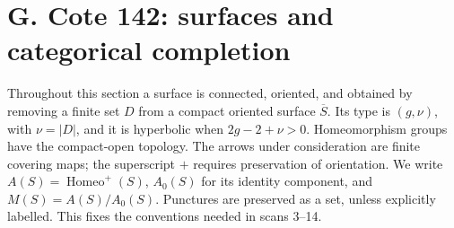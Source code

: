 \section{G. Cote 142: surfaces and categorical completion}
\label{sec:G}

Throughout this section a surface is connected, oriented, and obtained by
removing a finite set $D$ from a compact oriented surface $\overline S$.
Its type is $(g,\nu)$, with $\nu=|D|$, and it is hyperbolic when
$2g-2+\nu>0$. Homeomorphism groups have the compact-open topology.
The arrows under consideration are finite covering maps; the superscript
$+$ requires preservation of orientation. We write
$A(S)=\operatorname{Homeo}^+(S)$, $A_0(S)$ for its identity component,
and $M(S)=A(S)/A_0(S)$. Punctures are preserved as a set, unless explicitly
labelled. This fixes the conventions needed in scans 3--14.

